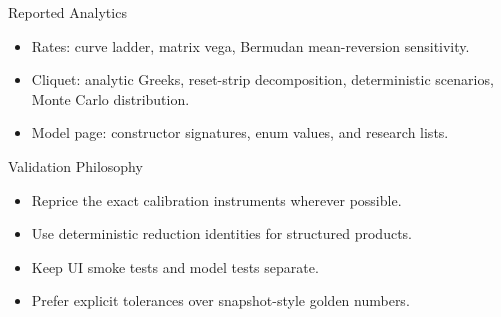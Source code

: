 \documentclass[aspectratio=169]{beamer}
\begin{document}
\begin{frame}{Reported Analytics}
\begin{itemize}
    \item Rates: curve ladder, matrix vega, Bermudan mean-reversion sensitivity.
    \item Cliquet: analytic Greeks, reset-strip decomposition, deterministic scenarios, Monte Carlo distribution.
    \item Model page: constructor signatures, enum values, and research lists.
\end{itemize}
\end{frame}

\begin{frame}{Validation Philosophy}
\begin{itemize}
    \item Reprice the exact calibration instruments wherever possible.
    \item Use deterministic reduction identities for structured products.
    \item Keep UI smoke tests and model tests separate.
    \item Prefer explicit tolerances over snapshot-style golden numbers.
\end{itemize}
\end{frame}
\end{document}
